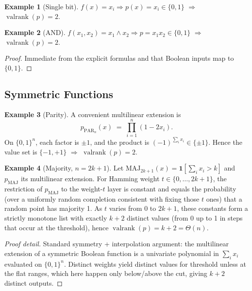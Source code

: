 \documentclass[12pt]{article}
\newcommand{\valrank}{\operatorname{valrank}}
\theoremstyle{definition}
\theoremstyle{definition}
\newtheorem{example}{Example}
\theoremstyle{remark}
\theoremstyle{remark}
\begin{document}
\begin{example}[Single bit]
$f(x) = x_i \Rightarrow p(x) = x_i \in \{0,1\}$ $\Rightarrow$ $\valrank(p) = 2$.
\end{example}

\begin{example}[AND]
$f(x_1,x_2) = x_1 \wedge x_2 \Rightarrow p = x_1 x_2 \in \{0,1\}$ $\Rightarrow$ $\valrank(p) = 2$.
\end{example}

\begin{proof}
Immediate from the explicit formulas and that Boolean inputs map to $\{0,1\}$.
\end{proof}

\subsection{Symmetric Functions}

\begin{example}[Parity]
A convenient multilinear extension is
\[
p_{\mathrm{PAR}_n}(x) \;=\; \prod_{i=1}^n (1 - 2x_i).
\]
On $\{0,1\}^n$, each factor is $\pm 1$, and the product is $(-1)^{\sum_i x_i} \in \{\pm 1\}$. Hence the value set is $\{-1, +1\}$ $\Rightarrow$ $\valrank(p) = 2$.
\end{example}

\begin{example}[Majority, $n = 2k+1$]
Let $\mathrm{MAJ}_{2k+1}(x) = \mathbf{1}[\sum_i x_i > k]$ and $p_{\mathrm{MAJ}}$ its multilinear extension. For Hamming weight $t \in \{0,\ldots,2k+1\}$, the restriction of $p_{\mathrm{MAJ}}$ to the weight-$t$ layer is constant and equals the probability (over a uniformly random completion consistent with fixing those $t$ ones) that a random point has majority 1. As $t$ varies from 0 to $2k+1$, these constants form a strictly monotone list with exactly $k+2$ distinct values (from 0 up to 1 in steps that occur at the threshold), hence $\valrank(p) = k+2 = \Theta(n)$.
\end{example}

\begin{proof}[Proof detail]
Standard symmetry + interpolation argument: the multilinear extension of a symmetric Boolean function is a univariate polynomial in $\sum_i x_i$ evaluated on $\{0,1\}^n$. Distinct weights yield distinct values for threshold unless at the flat ranges, which here happen only below/above the cut, giving $k+2$ distinct outputs.
\end{proof}
\end{document}
